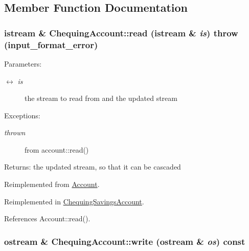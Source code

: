 \subsection{Member Function Documentation}
\hypertarget{classChequingAccount_b0aaf92f019e79f95c39a0f6996acbf5}{
\subsubsection[read]{\setlength{\rightskip}{0pt plus 5cm}istream \& ChequingAccount::read (istream \& {\em is})  throw (input\_\-format\_\-error)}}
\label{classChequingAccount_b0aaf92f019e79f95c39a0f6996acbf5}


\begin{Desc}
\item[Parameters:]
\begin{description}
\item[\mbox{$\leftrightarrow$} {\em is}]the stream to read from and the updated stream \end{description}
\end{Desc}
\begin{Desc}
\item[Exceptions:]
\begin{description}
\item[{\em thrown}]from account::read() \end{description}
\end{Desc}
\begin{Desc}
\item[Returns:]the updated stream, so that it can be cascaded \end{Desc}


Reimplemented from \hyperlink{classAccount_1ef84736fe231b64547ba0b7824ac7c6}{Account}.

Reimplemented in \hyperlink{classChequingSavingsAccount_c0de0e2d3ac55227f31a4715ae257646}{ChequingSavingsAccount}.

References Account::read().\hypertarget{classChequingAccount_b85b405548099388a5d7866ed9065d33}{
\subsubsection[write]{\setlength{\rightskip}{0pt plus 5cm}ostream \& ChequingAccount::write (ostream \& {\em os}) const}}
\label{classChequingAccount_b85b405548099388a5d7866ed9065d33}


